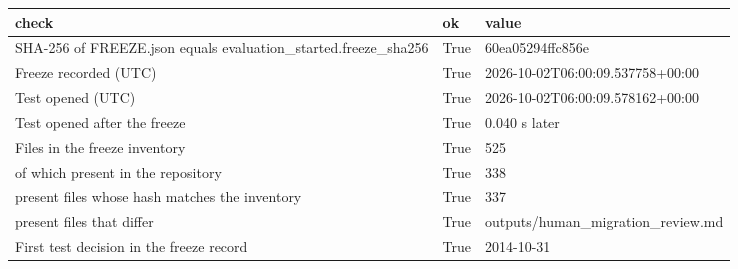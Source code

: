 \begin{tabular}{p{8cm}lp{6cm}}
\toprule
check & ok & value \\
\midrule
SHA-256 of FREEZE.json equals evaluation\_started.freeze\_sha256 & True & 60ea05294ffc856e \\
Freeze recorded (UTC) & True & 2026-10-02T06:00:09.537758+00:00 \\
Test opened (UTC) & True & 2026-10-02T06:00:09.578162+00:00 \\
Test opened after the freeze & True & 0.040 s later \\
Files in the freeze inventory & True & 525 \\
of which present in the repository & True & 338 \\
present files whose hash matches the inventory & True & 337 \\
present files that differ & True & outputs/human\_migration\_review.md \\
First test decision in the freeze record & True & 2014-10-31 \\
\bottomrule
\end{tabular}
